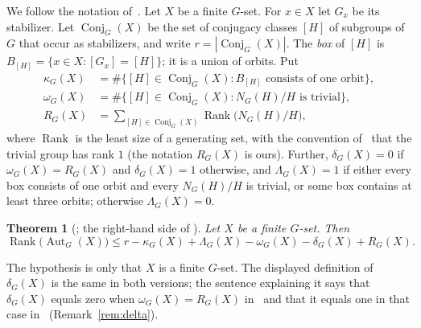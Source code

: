 \documentclass[11pt]{article}
\newtheorem{citedtheorem}{Theorem}
\theoremstyle{remark}
\newcommand{\Rank}{\operatorname{Rank}}
\newcommand{\Aut}{\operatorname{Aut}}
\newcommand{\Conj}{\operatorname{Conj}}
\begin{document}
We follow the notation of~\cite{lrr}. Let $X$ be a finite $G$-set. For $x\in
X$ let $G_x$ be its stabilizer. Let $\Conj_G(X)$ be the set of conjugacy
classes $[H]$ of subgroups of $G$ that occur as stabilizers, and write
$r=|\Conj_G(X)|$. The \emph{box} of $[H]$ is
$B_{[H]}=\{x\in X: [G_x]=[H]\}$; it is a union of orbits. Put
\begin{align*}
\kappa_G(X)&=\#\{[H]\in\Conj_G(X): B_{[H]}\text{ consists of one orbit}\},\\
\omega_G(X)&=\#\{[H]\in\Conj_G(X): N_G(H)/H \text{ is trivial}\},\\
R_G(X)&=\textstyle\sum_{[H]\in\Conj_G(X)}\Rank\bigl(N_G(H)/H\bigr),
\end{align*}
where $\Rank$ is the least size of a generating set, with the convention
of~\cite{lrr,rlr} that the trivial group has rank $1$ (the notation $R_G(X)$
is ours). Further, $\delta_G(X)=0$ if $\omega_G(X)=R_G(X)$ and
$\delta_G(X)=1$ otherwise, and $\Lambda_G(X)=1$ if either every box consists of
one orbit and every $N_G(H)/H$ is trivial, or some box contains at least three
orbits; otherwise $\Lambda_G(X)=0$.

\begin{citedtheorem}[{\cite[Theorem~4]{lrr}; the right-hand side of
\cite[Theorem~5]{rlr}}]\label{thm:lrr}
Let $X$ be a finite $G$-set. Then
\[
\Rank\bigl(\Aut_G(X)\bigr)\le r-\kappa_G(X)+\Lambda_G(X)-\omega_G(X)
-\delta_G(X)+R_G(X).
\]
\end{citedtheorem}

The hypothesis is only that $X$ is a finite $G$-set. The displayed definition
of $\delta_G(X)$ is the same in both versions; the sentence explaining it says
that $\delta_G(X)$ equals zero when $\omega_G(X)=R_G(X)$ in~\cite[p.~8]{lrr}
and that it equals one in that case in~\cite[p.~6]{rlr}
(Remark~\ref{rem:delta}).
\end{document}
